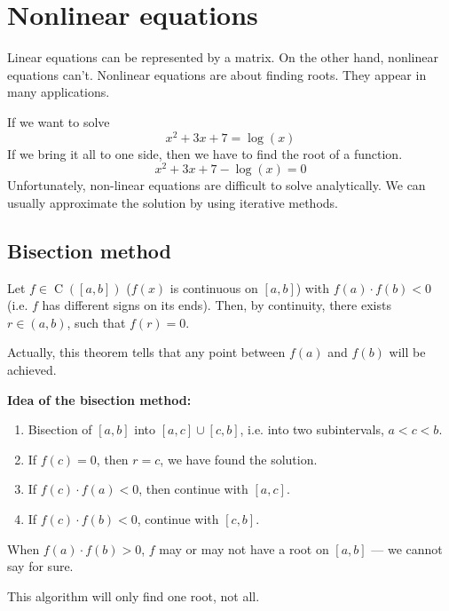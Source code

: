
\pagebreak
\section{Nonlinear equations}
Linear equations can be represented by a matrix. On the other hand, nonlinear equations can't.
Nonlinear equations are about finding roots. They appear in many applications.

\begin{example}
    If we want to solve
    \[ x^2 + 3x + 7 = \log(x) \]
    If we bring it all to one side, then we have to find the root of a function.
    \[ x^2 + 3x + 7 - \log(x) = 0 \]
    Unfortunately, non-linear equations are difficult to solve analytically.
    We can usually approximate the solution by using iterative methods.
\end{example}

\subsection{Bisection method}
\begin{theorem}
    Let $f \in \operatorname{C}([a, b])$ ($f(x)$ is continuous on $[a, b]$)
    with $f(a) \cdot f(b) < 0$ (i.e. $f$ has different signs on its ends).
    Then, by continuity, there exists $r \in (a, b)$, such that
    $f(r) = 0$.
\end{theorem}
\begin{remark}
    Actually, this theorem tells that any point between $f(a)$ and $f(b)$ will be achieved.
\end{remark}

\textbf{Idea of the bisection method:}
\begin{enumerate}
    \item {
        Bisection of $[a, b]$ into $[a, c] \cup [c, b]$, i.e.
        into two subintervals, $a < c < b$.
    }
    \item {
        If $f(c) = 0$, then $r = c$, we have found the solution.
    }
    \item {
        If $f(c) \cdot f(a) < 0$, then continue with $[a, c]$.
    }
    \item {
        If $f(c) \cdot f(b) < 0$, continue with $[c, b]$.
    }
\end{enumerate}
\begin{remark}
    When $f(a) \cdot f(b) > 0$, $f$ may or may not have a root on $[a, b]$ ---
    we cannot say for sure.
\end{remark}
\begin{remark}
    This algorithm will only find one root, not all.
\end{remark}

